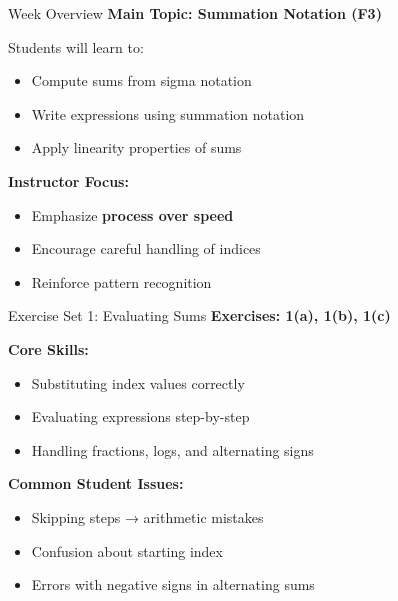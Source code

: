 \documentclass[dvipsnames]{beamer}
\begin{document}






\begin{frame}{Week Overview}
\textbf{Main Topic: Summation Notation (F3)}

\vspace{1em}

Students will learn to:
\begin{itemize}
\item Compute sums from sigma notation
\item Write expressions using summation notation
\item Apply linearity properties of sums
\end{itemize}

\vspace{1em}

\textbf{Instructor Focus:}
\begin{itemize}
\item Emphasize \textbf{process over speed}
\item Encourage careful handling of indices
\item Reinforce pattern recognition
\end{itemize}
\end{frame}


\begin{frame}{Exercise Set 1: Evaluating Sums}
\textbf{Exercises: 1(a), 1(b), 1(c)}

\vspace{1em}

\textbf{Core Skills:}
\begin{itemize}
\item Substituting index values correctly
\item Evaluating expressions step-by-step
\item Handling fractions, logs, and alternating signs
\end{itemize}

\vspace{1em}

\textbf{Common Student Issues:}
\begin{itemize}
\item Skipping steps → arithmetic mistakes
\item Confusion about starting index
\item Errors with negative signs in alternating sums
\end{itemize}
\end{frame}
\end{document}

